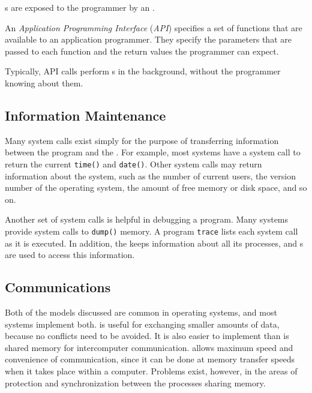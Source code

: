 s are exposed to the programmer by an .
\begin{definition}\label{def:API}
  An \emph{Application Programming Interface} (\emph{API}) specifies a set of functions that are available to an application programmer.
  They specify the parameters that are passed to each function and the return values the programmer can expect.

  Typically, API calls perform s in the background, without the programmer knowing about them.
\end{definition}




\subsection{Information Maintenance}\label{subsec:Information_Maintenance}
Many system calls exist simply for the purpose of transferring information between the  program and the .
For example, most systems have a system call to return the current \texttt{time()} and \texttt{date()}.
Other system calls may return information about the system, such as the number of current users, the version number of the operating system, the amount of free memory or disk space, and so on.

Another set of system calls is helpful in debugging a program.
Many systems provide system calls to \texttt{dump()} memory.
A program \texttt{trace} lists each system call as it is executed.
In addition, the  keeps information about all its processes, and s are used to access this information.

\subsection{Communications}\label{subsec:Communications}
Both of the models discussed are common in operating systems, and most systems implement both.
 is useful for exchanging smaller amounts of data, because no conflicts need to be avoided.
It is also easier to implement than is shared memory for intercomputer communication.
 allows maximum speed and convenience of communication, since it can be done at memory transfer speeds when it takes place within a computer.
Problems exist, however, in the areas of protection and synchronization between the processes sharing memory.

